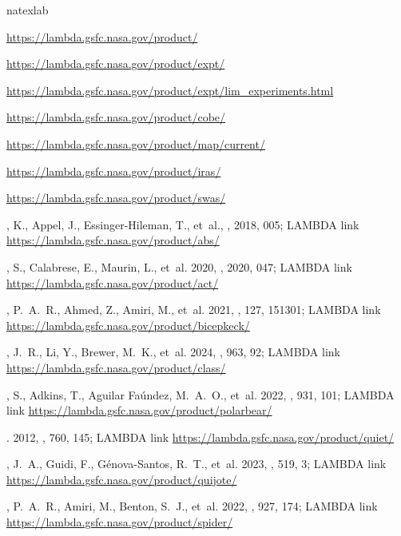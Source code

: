 \documentclass[twocolumn,tighten]{aastex631}
\begin{document}

\begin{thebibliography}
\expandafter\ifx\csname natexlab\endcsname\relax\def\natexlab#1{#1}\fi

\quad \url{https://lambda.gsfc.nasa.gov/product/}

\quad \url{https://lambda.gsfc.nasa.gov/product/expt/}

\quad \url{https://lambda.gsfc.nasa.gov/product/expt/lim_experiments.html}

\quad \url{https://lambda.gsfc.nasa.gov/product/cobe/}

\quad \url{https://lambda.gsfc.nasa.gov/product/map/current/}

\quad \url{https://lambda.gsfc.nasa.gov/product/iras/}

\quad \url{https://lambda.gsfc.nasa.gov/product/swas/}

, K., {Appel}, J., {Essinger-Hileman}, T., {et~al.}, \jcap, 2018, 005; LAMBDA link \url{https://lambda.gsfc.nasa.gov/product/abs/}

, S., {Calabrese}, E., {Maurin}, L., {et~al.} 2020, \jcap, 2020, 047; LAMBDA link \url{https://lambda.gsfc.nasa.gov/product/act/}

, P.~A.~R., {Ahmed}, Z., {Amiri}, M., {et~al.} 2021, \prl, 127, 151301; LAMBDA link \url{https://lambda.gsfc.nasa.gov/product/bicepkeck/}

, J.~R., {Li}, Y., {Brewer}, M.~K., {et~al.} 2024, \apj, 963, 92; LAMBDA link \url{https://lambda.gsfc.nasa.gov/product/class/}

, S., {Adkins}, T., {Aguilar Fa{\'u}ndez}, M.~A.~O., {et~al.} 2022,
  \apj, 931, 101; LAMBDA link \url{https://lambda.gsfc.nasa.gov/product/polarbear/}
  
. 2012, \apj, 760, 145; LAMBDA link \url{https://lambda.gsfc.nasa.gov/product/quiet/}

, J.~A., {Guidi}, F., {G{\'e}nova-Santos}, R.~T., {et~al.} 2023, \mnras, 519, 3; LAMBDA link \url{https://lambda.gsfc.nasa.gov/product/quijote/}

, P.~A.~R., {Amiri}, M., {Benton}, S.~J., {et~al.} 2022, \apj, 927, 174; LAMBDA link \url{https://lambda.gsfc.nasa.gov/product/spider/}


\end{thebibliography}
\end{document}
